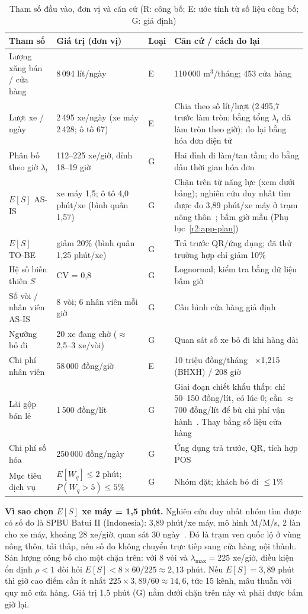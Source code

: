 \begin{table}[htbp]\centering\small
\caption{Tham số đầu vào, đơn vị và căn cứ (R: công bố; E: ước tính từ số liệu công bố; G: giả định)}\label{r2:assumptions}
\begin{tabularx}{\linewidth}{@{}p{36mm}p{36mm}p{9mm}Y@{}}
\toprule
Tham số & Giá trị (đơn vị) & Loại & Căn cứ / cách đo lại \\
\midrule
Lượng xăng bán / cửa hàng & 8\,094 lít/ngày & E & 110\,000 m$^3$/tháng; 453 cửa hàng~\cite{sct2026} \\
Lượt xe / ngày & 2\,495 xe/ngày (xe máy 2\,428; ô tô 67) & E & Chia theo số lít/lượt (2\,495,7 trước làm tròn; bằng tổng $\lambda_t$ đã làm tròn theo giờ); đo lại bằng hóa đơn điện tử \\
Phân bố theo giờ $\lambda_t$ & 112--225 xe/giờ, đỉnh 18--19 giờ & G & Hai đỉnh đi làm/tan tầm; đo bằng dấu thời gian hóa đơn \\
$E[S]$ AS-IS & xe máy 1,5; ô tô 4,0 phút/xe (bình quân 1,57) & G & Chặn trên từ năng lực (xem dưới bảng); nghiên cứu duy nhất tìm được đo 3,89 phút/xe máy ở trạm nông thôn~\cite{batui}; bấm giờ mẫu (Phụ lục~\ref{r2:app-plan}) \\
$E[S]$ TO-BE & giảm 20\% (bình quân 1,25 phút/xe) & G & Trả trước QR/ứng dụng; đã thử trường hợp chỉ giảm 10\% \\
Hệ số biến thiên $S$ & CV = 0,8 & G & Lognormal; kiểm tra bằng dữ liệu bấm giờ \\
Số vòi / nhân viên AS-IS & 8 vòi; 6 nhân viên mỗi giờ & G & Cấu hình cửa hàng giả định \\
Ngưỡng bỏ đi & 20 xe đang chờ ($\approx$2,5--3 xe/vòi) & G & Quan sát số xe bỏ đi khi hàng dài \\
Chi phí nhân viên & 58\,000 đồng/giờ & E & 10 triệu đồng/tháng~\cite{wage} $\times$1,215 (BHXH) / 208 giờ \\
Lãi gộp bán lẻ & 1\,500 đồng/lít & G & Giai đoạn chiết khấu thấp: chỉ 50--150 đồng/lít, có lúc 0; cần $\approx$700 đồng/lít để bù chi phí vận hành~\cite{chietkhau}. Thay bằng số liệu cửa hàng \\
Chi phí số hóa & 250\,000 đồng/ngày & G & Ứng dụng trả trước, QR, tích hợp POS \\
Mục tiêu dịch vụ & $E[W_q]\le2$ phút; $P(W_q{>}5)\le5\%$ & G & Nhóm đặt; khách bỏ đi $\le1\%$ \\
\bottomrule
\end{tabularx}
\end{table}

\textbf{Vì sao chọn $E[S]$ xe máy = 1,5 phút.} Nghiên cứu duy nhất nhóm tìm được
có số đo là SPBU Batui II (Indonesia): 3,89 phút/xe máy, mô hình M/M/s, 2 làn
cho xe máy, khoảng 28 xe/giờ, quan sát 30 ngày~\cite{batui}. Đó là trạm ven
quốc lộ ở vùng nông thôn, tải thấp, nên số đo không chuyển trực tiếp sang cửa
hàng nội thành. Sản lượng công bố cho một chặn trên: với 8 vòi và
$\lambda_{\max}=225$ xe/giờ, điều kiện ổn định $\rho<1$ đòi hỏi
$E[S]<8\times60/225\approx2{,}13$ phút. Nếu $E[S]=3{,}89$ phút thì giờ cao
điểm cần ít nhất $225\times3{,}89/60\approx14{,}6$, tức 15 kênh, mâu thuẫn với
quy mô cửa hàng. Giá trị 1,5 phút (G) nằm dưới chặn trên này và phải được bấm
giờ lại.

